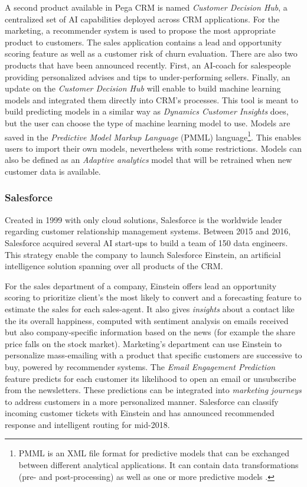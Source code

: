 A second product available in Pega CRM is named \textit{Customer Decision Hub}, a centralized set of AI capabilities deployed across CRM applications. For the marketing, a recommender system is used to propose the most appropriate product to customers. The sales application contains a lead and opportunity scoring feature as well as a customer risk of churn evaluation. There are also two products that have been announced recently. First, an AI-coach for salespeople providing personalized advises and tips to under-performing sellers. Finally, an update on the \textit{Customer Decision Hub} will enable to build machine learning models and integrated them directly into CRM's processes. This tool is meant to build predicting models in a similar way as \textit{Dynamics Customer Insights} does, but the user can choose the type of machine learning model to use. Models are saved in the \textit{Predictive Model Markup Language} (PMML) language\footnote{PMML is an XML file format for predictive models that can be exchanged between different analytical applications. It can contain data transformations (pre- and post-processing) as well as one or more predictive models \cite{pmml}.}. This enables users to import their own models, nevertheless with some restrictions. Models can also be defined as an \textit{Adaptive analytics} model that will be retrained when new customer data is available.

\subsubsection*{Salesforce}
Created in 1999 with only cloud solutions, Salesforce is the worldwide leader regarding customer relationship management systems. Between 2015 and 2016, Salesforce acquired several AI start-ups to build a team of 150 data engineers. This strategy enable the company to launch Salesforce Einstein, an artificial intelligence solution spanning over all products of the CRM.

For the sales department of a company, Einstein offers lead an opportunity scoring to prioritize client's the most likely to convert and a forecasting feature to estimate the sales for each sales-agent. It also gives \textit{insights} about a contact like the its overall happiness, computed with sentiment analysis on emails received but also company-specific information based on the news (for example the share price falls on the stock market). Marketing's department can use Einstein to personalize mass-emailing with a product that specific customers are successive to buy, powered by recommender systems. The \textit{Email Engagement Prediction} feature predicts for each customer its likelihood to open an email or unsubscribe from the newsletters. These predictions can be integrated into \textit{marketing journeys} to address customers in a more personalized manner. Salesforce can classify incoming customer tickets with Einstein and has announced recommended response and intelligent routing for mid-2018.

